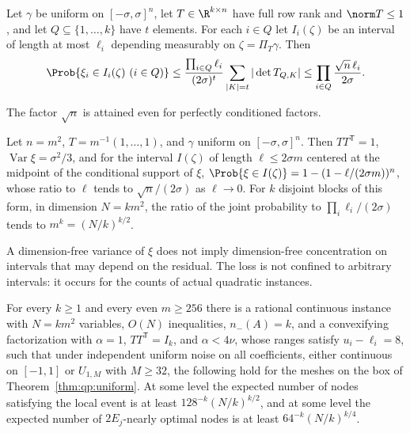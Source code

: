 \begin{lemma}\label{lem:qp:volume}
Let $\gamma$ be uniform on $[-\sigma,\sigma]^n$, let $T\in\R^{k\times n}$ have
full row rank and $\norm T\le1$, and let $Q\subseteq\{1,\dots,k\}$ have $t$
elements. For each $i\in Q$ let $I_i(\zeta)$ be an interval of length at most
$\ell_i$ depending measurably on $\zeta=\Pi_T\gamma$. Then
\[
 \Prob\{\xi_i\in I_i(\zeta)\ (i\in Q)\}
 \le\frac{\prod_{i\in Q}\ell_i}{(2\sigma)^t}\sum_{|K|=t}|\det T_{Q,K}|
 \le\prod_{i\in Q}\frac{\sqrt n\,\ell_i}{2\sigma}.
\]
\end{lemma}

The factor $\sqrt n$ is attained even for perfectly conditioned factors.

\begin{proposition}\label{prop:qp:fiber-sharp}
Let $n=m^2$, $T=m^{-1}(1,\dots,1)$, and $\gamma$ uniform on
$[-\sigma,\sigma]^n$. Then $TT^{\mathsf T}=1$, $\operatorname{Var}\xi=\sigma^2/3$,
and for the interval $I(\zeta)$ of length $\ell\le2\sigma m$ centered at the
midpoint of the conditional support of $\xi$,
$\Prob\{\xi\in I(\zeta)\}=1-(1-\ell/(2\sigma m))^n$, whose ratio to $\ell$
tends to $\sqrt n/(2\sigma)$ as $\ell\to0$. For $k$ disjoint blocks of this
form, in dimension $N=km^2$, the ratio of the joint probability to
$\prod_i\ell_i/(2\sigma)$ tends to $m^k=(N/k)^{k/2}$.
\end{proposition}

A dimension-free variance of $\xi$ does not imply dimension-free
concentration on intervals that may depend on the residual. The loss is not
confined to arbitrary intervals: it occurs for the counts of actual quadratic
instances.

\begin{proposition}\label{prop:qp:ambient-barrier}
For every $k\ge1$ and every even $m\ge256$ there is a rational continuous
instance with $N=km^2$ variables, $O(N)$ inequalities, $n_-(A)=k$, and a
convexifying factorization with $\alpha=1$, $TT^{\mathsf T}=I_k$, and $\alpha<4\nu$,
whose ranges satisfy $u_i-\ell_i=8$, such that under independent uniform
noise on all coefficients, either continuous on $[-1,1]$ or $U_{1,M}$
with $M\ge32$, the following hold for the meshes on the box of
Theorem~\ref{thm:qp:uniform}. At some level the expected number of nodes
satisfying the local event is at least $128^{-k}(N/k)^{k/2}$, and at some
level the expected number of $2E_j$-nearly optimal nodes is at least
$64^{-k}(N/k)^{k/4}$.
\end{proposition}

